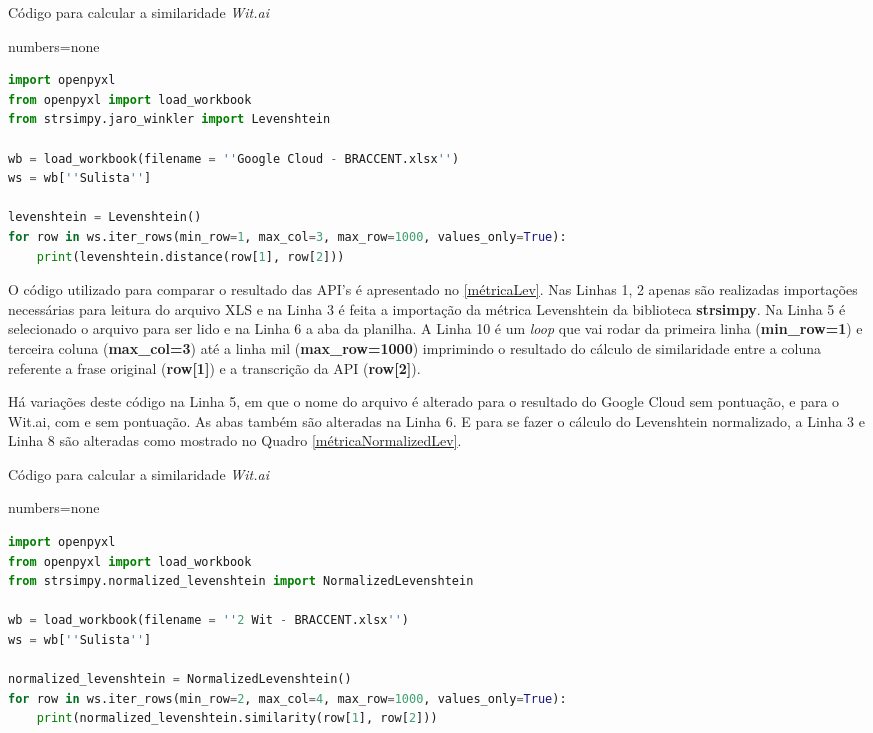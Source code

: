 \begin{quadro}[h]
\centering
\caption{Código para calcular a similaridade \emph{Wit.ai}}
\label{métricaLev}
{numbers=none}
\begin{lstlisting}[language=Python]
import openpyxl
from openpyxl import load_workbook
from strsimpy.jaro_winkler import Levenshtein

wb = load_workbook(filename = ''Google Cloud - BRACCENT.xlsx'')
ws = wb[''Sulista'']

levenshtein = Levenshtein()
for row in ws.iter_rows(min_row=1, max_col=3, max_row=1000, values_only=True):
    print(levenshtein.distance(row[1], row[2]))
\end{lstlisting}
\end{quadro}


O código utilizado para comparar o resultado das API's é apresentado no \autoref{métricaLev}. Nas Linhas 1, 2 apenas são realizadas importações necessárias para leitura do arquivo XLS e na Linha 3 é feita a importação da métrica Levenshtein da biblioteca \textbf{strsimpy}. Na Linha 5 é selecionado o arquivo para ser lido e na Linha 6 a aba da planilha. A Linha 10 é  um \textit{loop} que vai rodar da primeira linha (\textbf{min\_row=1}) e terceira coluna (\textbf{max\_col=3}) até a linha mil (\textbf{max\_row=1000}) imprimindo o resultado do cálculo de similaridade entre a coluna referente a frase original (\textbf{row[1]}) e a transcrição da API (\textbf{row[2]}).

Há variações deste código na Linha 5, em que o nome do arquivo é alterado para o resultado do Google Cloud sem pontuação, e para o Wit.ai, com e sem pontuação. As abas também são alteradas na Linha 6. E para se fazer o cálculo do Levenshtein normalizado, a Linha 3 e Linha 8 são alteradas como mostrado no Quadro \ref{métricaNormalizedLev}.


\begin{quadro}[h]
\centering
\caption{Código para calcular a similaridade \emph{Wit.ai}}
\label{métricaNormalizedLev}
{numbers=none}
\begin{lstlisting}[language=Python]
import openpyxl
from openpyxl import load_workbook
from strsimpy.normalized_levenshtein import NormalizedLevenshtein

wb = load_workbook(filename = ''2 Wit - BRACCENT.xlsx'')
ws = wb[''Sulista'']

normalized_levenshtein = NormalizedLevenshtein()
for row in ws.iter_rows(min_row=2, max_col=4, max_row=1000, values_only=True):
    print(normalized_levenshtein.similarity(row[1], row[2]))
\end{lstlisting}
\end{quadro}



\vspace*{\fill}

{~~~~~~~~~}


{~~~~~~~~~}


